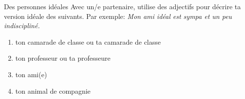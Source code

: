 \begin{frame}{Des personnes idéales}
  Avec un/e partenaire, utilise des adjectifs pour décrire ta version idéale des suivants.
  Par exemple:
  \emph{Mon ami idéal est sympa et un peu indiscipliné.} \\
  \begin{enumerate}
    \item ton camarade de classe ou ta camarade de classe
    \item ton professeur ou ta professeure
    \item ton ami(e)
    \item ton animal de compagnie
  \end{enumerate}
\end{frame}